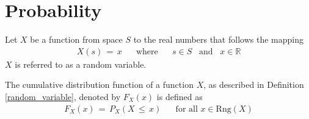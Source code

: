 \section{Probability}

\begin{definition}
Let $X$ be a function from space $S$ to the real numbers that follows the mapping
\begin{align*}
    X(s) \hspace{2pt} = \hspace{2pt} x \hspace{20pt} \text{where} \hspace{20pt} s \in S \hspace{10pt} \text{and} \hspace{10pt} x \in \mathbb{R}
\end{align*}
$X$ is referred to as a random variable.
\label{random_variable}
\end{definition}

\begin{definition}
The cumulative distribution function of a function $X$, as described in Definition \ref{random_variable}, denoted by $F_{X}(x)$ is defined as
\begin{align*}
    F_{X}(x) \hspace{2pt} = \hspace{2pt} P_{X}(X \hspace{2pt} \leq \hspace{2pt} x) \hspace{20pt} \text{for all} \hspace{4pt} x \in \text{Rng}(X)
\end{align*}
\label{cumulative_distribution_function}
\end{definition}

